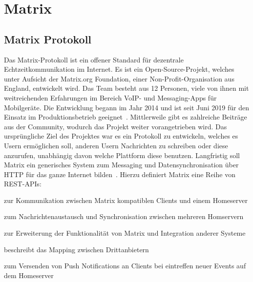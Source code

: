    \newpage
    \section{Matrix}\label{sec:matrix}

    \subsection{Matrix Protokoll}\label{subsec:matrix-protokoll}
    Das Matrix-Protokoll ist ein offener Standard für dezentrale Echtzeitkommunikation im Internet.
    Es ist ein Open-Source-Projekt, welches unter Aufsicht der Matrix.org Foundation, einer Non-Profit-Organisation aus England, entwickelt wird.
    Das Team besteht aus 12 Personen, viele von ihnen mit weitreichenden Erfahrungen im Bereich VoIP- und Messaging-Apps für Mobilgeräte.
    Die Entwicklung begann im Jahr 2014 und ist seit Juni 2019 für den Einsatz im Produktionsbetrieb geeignet~\cite{matrixfaq}.
    Mittlerweile gibt es zahlreiche Beiträge aus der Community, wodurch das Projekt weiter vorangetrieben wird.
    Das ursprüngliche Ziel des Projektes war es ein Protokoll zu entwickeln, welches es Usern ermöglichen soll, anderen Usern Nachrichten zu schreiben oder diese anzurufen, unabhängig davon welche Plattform diese benutzen.
    Langfristig soll Matrix ein generisches System zum Messaging und Datensynchronisation über HTTP für das ganze Internet bilden~\cite{matrixfaq}.
    Hierzu definiert Matrix eine Reihe von REST-APIs:
    \begin{description}[leftmargin=!,labelwidth=5.5cm]
        \item [Client-Server-API\footnotemark]  zur Kommunikation zwischen Matrix kompatiblen Clients und einem Homeserver
        \item [Server-Server-API\footnotemark]  zum Nachrichtenaustausch und Synchronisation zwischen mehreren Homservern
        \item [Application-Service-API\footnotemark]  zur Erweiterung der Funktionalität von Matrix und Integration anderer Systeme
        \item [Identity-Service-API\footnotemark]  beschreibt das Mapping zwischen Drittanbietern
        \item [Push-Gateway-API\footnotemark]  zum Versenden von Push Notifications an Clients bei eintreffen neuer Events auf dem Homeserver
    \end{description}

